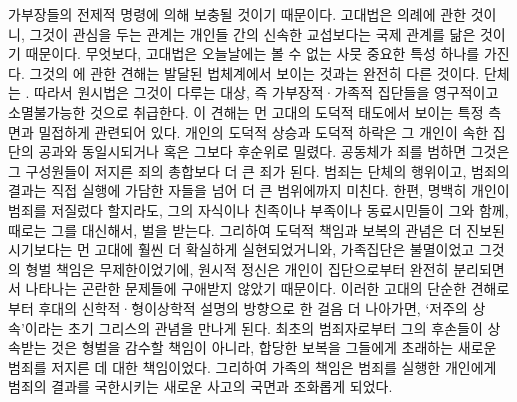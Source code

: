 가부장들의 전제적 명령에 의해 보충될 것이기 때문이다.
고대법은 의례에 관한 것이니,
그것이 관심을 두는 관계는
개인들 간의 신속한 교섭보다는
국제 관계를 닮은 것이기 때문이다.
무엇보다, 고대법은 오늘날에는 볼 수 없는 사뭇 중요한 특성 하나를 가진다.
그것의 에 관한 견해는
발달된 법체계에서 보이는 것과는 완전히 다른 것이다.
단체는 .
따라서 원시법은 그것이 다루는 대상, 즉 가부장적^^b7가족적 집단들을
영구적이고 소멸불가능한 것으로 취급한다.
이 견해는 먼 고대의 도덕적 태도에서 보이는 특정 측면과 밀접하게 관련되어 있다.
개인의 도덕적 상승과 도덕적 하락은 그 개인이 속한 집단의 공과와
동일시되거나 혹은 그보다 후순위로 밀렸다.
공동체가 죄를 범하면
그것은 그 구성원들이 저지른 죄의 총합보다 더 큰 죄가 된다.
범죄는 단체의 행위이고,
범죄의 결과는 직접 실행에 가담한 자들을 넘어 더 큰 범위에까지 미친다.
한편, 명백히 개인이 범죄를 저질렀다 할지라도,
그의 자식이나 친족이나 부족이나 동료시민들이 그와 함께,
때로는 그를 대신해서, 벌을 받는다.
그리하여 도덕적 책임과 보복의 관념은
더 진보된 시기보다는 먼 고대에 훨씬 더 확실하게 실현되었거니와,
가족집단은 불멸이었고 그것의 형벌 책임은 무제한이었기에,
원시적 정신은 개인이 집단으로부터 완전히 분리되면서 나타나는 곤란한 문제들에
구애받지 않았기 때문이다.
이러한 고대의 단순한 견해로부터 후대의 신학적^^b7형이상학적 설명의 방향으로
한 걸음 더 나아가면,
`저주의 상속'이라는 초기 그리스의 관념을 만나게 된다.
최초의 범죄자로부터 그의 후손들이 상속받는 것은
형벌을 감수할 책임이 아니라,
합당한 보복을 그들에게 초래하는
새로운 범죄를 저지른 데 대한 책임이었다.
그리하여 가족의 책임은
범죄를 실행한 개인에게 범죄의 결과를 국한시키는 새로운 사고의 국면과
조화롭게 되었다.


